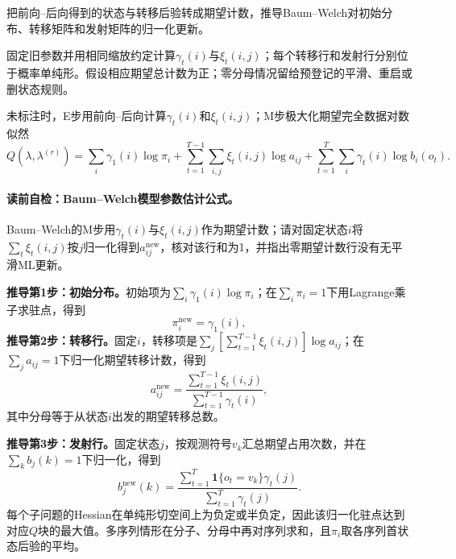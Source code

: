 \begingroup
{}

\begin{derivationgoalbox}
把前向--后向得到的状态与转移后验转成期望计数，推导Baum--Welch对初始分布、转移矩阵和发射矩阵的归一化更新。
\end{derivationgoalbox}
\begin{derivationprepbox}
固定旧参数并用相同缩放约定计算$\gamma_t(i)$与$\xi_t(i,j)$；每个转移行和发射行分别位于概率单纯形。假设相应期望总计数为正；零分母情况留给预登记的平滑、重启或删状态规则。
\end{derivationprepbox}
未标注时，E步用前向--后向计算$\gamma_t(i)$和$\xi_t(i,j)$；M步极大化期望完全数据对数似然
\[
Q(\lambda,\lambda^{(r)})=
\sum_i\gamma_1(i)\log\pi_i
+\sum_{t=1}^{T-1}\sum_{i,j}\xi_t(i,j)\log a_{ij}
+\sum_{t=1}^{T}\sum_i\gamma_t(i)\log b_i(o_t).
\]

\paragraph{读前自检：Baum--Welch模型参数估计公式。}Baum--Welch的M步用$\gamma_t(i)$与$\xi_t(i,j)$作为期望计数；请对固定状态$i$将$\sum_t\xi_t(i,j)$按$j$归一化得到$a_{ij}^{\mathrm{new}}$，核对该行和为1，并指出零期望计数行没有无平滑ML更新。\par

\textbf{推导第1步：初始分布。}初始项为$\sum_i\gamma_1(i)\log\pi_i$；在$\sum_i\pi_i=1$下用Lagrange乘子求驻点，得到
\[
\pi_i^{\mathrm{new}}=\gamma_1(i),
\]
\textbf{推导第2步：转移行。}固定$i$，转移项是$\sum_j[\sum_{t=1}^{T-1}\xi_t(i,j)]\log a_{ij}$；在$\sum_ja_{ij}=1$下归一化期望转移计数，得到
\[
a_{ij}^{\mathrm{new}}=
\frac{\sum_{t=1}^{T-1}\xi_t(i,j)}
{\sum_{t=1}^{T-1}\gamma_t(i)},
\]
其中分母等于从状态$i$出发的期望转移总数。\par
\textbf{推导第3步：发射行。}固定状态$j$，按观测符号$v_k$汇总期望占用次数，并在$\sum_kb_j(k)=1$下归一化，得到
\[
b_j^{\mathrm{new}}(k)=
\frac{\sum_{t=1}^{T}\mathbf1\{o_t=v_k\}\gamma_t(j)}
{\sum_{t=1}^{T}\gamma_t(j)}.
\]
每个子问题的Hessian在单纯形切空间上为负定或半负定，因此该归一化驻点达到对应$Q$块的最大值。多序列情形在分子、分母中再对序列求和，且$\pi_i$取各序列首状态后验的平均。


